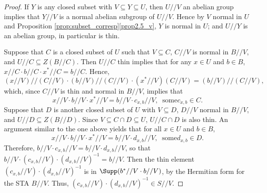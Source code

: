 \begin{proof}
If $Y$ is any closed subset with $V \subseteq Y \subseteq U$, then
$U//V$ an abelian group implies that $Y//V$ is a normal abelian subgroup
of $U//V$. Hence by $V$ normal in $U$ and Proposition
\ref{prop:subset_corresp}\ref{prop2.5_v}, $Y$
is normal in $U$; and $U//Y$ is an abelian group, in particular is thin.

Suppose that $C$ is a closed subset of $U$ such that $V \subseteq C$,
$C//V$ is normal in $B//V$, and $U//C \subseteq Z(B//C)$. Then $U//C$ thin
implies that for any $x \in U$ and $b \in B$, 
$x//C\cdot b//C\cdot x^*//C = b//C$. Hence, 
\[
 (x//V)//(C//V)\cdot
(b//V)//(C//V)\cdot (x^*//V)(C//V) = (b//V)//(C//V),
\] 
which, since $C//V$ is thin and normal in $B//V$, implies that
\[
x//V\cdot b//V\cdot x^*//V = b//V\cdot c_{x,b}//V, \ \mbox{ some
}c_{x,b}
\in C.
\]
Suppose that $D$ is another closed subset of $U$ with $V \subseteq D$,
$D//V$
normal in $B//V$, and $U//D \subseteq Z(B//D)$. 
Since $V \subseteq C\cap D
\subseteq U$, $U//C\cap D$ is also thin. An argument similar to
the one above 
yields that for all $x \in U$ and $b \in B$,
\[
x//V\cdot b//V\cdot x^*//V = b//V\cdot d_{x,b}//V, \ \mbox{ some
}d_{x,b}
\in D.
\]
Therefore, $b//V\cdot c_{x,b}//V = b//V\cdot d_{x,b}//V$, so that $b//V\cdot
(c_{x,b}//V)\cdot (d_{x,b}//V)^{-1} = b//V$. Then the thin element
$(c_{x,b}//V)\cdot (d_{x,b}//V)^{-1}$ is in $\Supp(b^*//V\cdot b//V)$, by the Hermitian
form for the STA $B//V$. Thus, $(c_{x,b}//V)\cdot (d_{x,b}//V)^{-1} \in S//V$. 


\end{proof}

